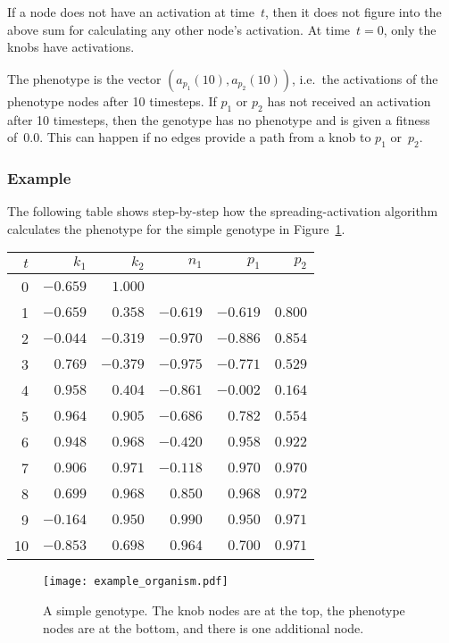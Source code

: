 \documentclass[letterpaper]{article}
\begin{document}
If a node does not have an activation at time~$t$, then it does not figure
into the above sum for calculating any other node's activation. At time~$t=0$,
only the knobs have activations.

The phenotype is the vector $(a_{p_1}(10), a_{p_2}(10))$, i.e.~the activations
of the phenotype nodes after 10 timesteps. If $p_1$ or $p_2$ has not received
an activation after 10 timesteps, then the genotype has no phenotype and is
given a fitness of~0.0. This can happen if no edges provide a path from a knob
to $p_1$ or~$p_2$.

\subsubsection{Example}

The following table shows step-by-step how the spreading-activation algorithm
calculates the phenotype for the simple genotype in
Figure~\ref{fig:simple-genotype}.

\medskip

\begin{tabularx}{\columnwidth}{rrrrrr}
$t$ & $k_1$ & $k_2$ & $n_1$ & $p_1$ & $p_2$ \\
\hline
0 & $-0.659$ & $1.000$ & & & \\
1 & $-0.659$ & $0.358$ & $-0.619$ & $-0.619$ & $0.800$ \\
2 & $-0.044$ & $-0.319$ & $-0.970$ & $-0.886$ & $0.854$ \\
3 & $0.769$ & $-0.379$ & $-0.975$ & $-0.771$ & $0.529$ \\
4 & $0.958$ & $0.404$ & $-0.861$ & $-0.002$ & $0.164$ \\
5 & $0.964$ & $0.905$ & $-0.686$ & $0.782$ & $0.554$ \\
6 & $0.948$ & $0.968$ & $-0.420$ & $0.958$ & $0.922$ \\
7 & $0.906$ & $0.971$ & $-0.118$ & $0.970$ & $0.970$ \\
8 & $0.699$ & $0.968$ & $0.850$ & $0.968$ & $0.972$ \\
9 & $-0.164$ & $0.950$ & $0.990$ & $0.950$ & $0.971$ \\
10 & $-0.853$ & $0.698$ & $0.964$ & $0.700$ & $0.971$ \\
\end{tabularx}

\medskip

\begin{figure}
\centering
\texttt{[image: example\_organism.pdf]}
\caption{A simple genotype. The knob nodes are at the top, the phenotype nodes
are at the bottom, and there is one additional node.}
\label{fig:simple-genotype}
\end{figure}
\end{document}
